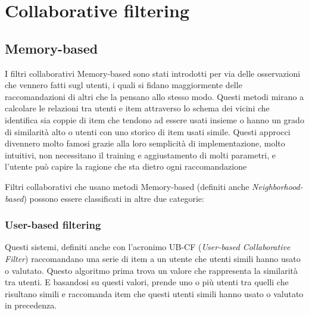 \chapter{Collaborative filtering}









\section{Memory-based} \hfill \break
I filtri collaborativi Memory-based sono stati introdotti per via delle osservazioni che vennero fatti sugl utenti, i quali si fidano
maggiormente delle raccomandazioni di altri che la pensano allo stesso modo. Questi metodi mirano a calcolare le relazioni tra utenti
e item attraverso lo schema dei vicini che identifica sia coppie di item che tendono ad essere usati insieme o hanno un grado di 
similarità alto o utenti con uno storico di item usati simile. \cite{taxonomy-of-recommender-agents-on-the-internet}
Questi approcci divennero molto famosi grazie alla loro semplicità di implementazione, molto intuitivi, non necessitano il training e
aggiustamento di molti parametri, e l'utente può capire la ragione che sta dietro ogni raccomandazione 

Filtri collaborativi che usano metodi Memory-based (definiti anche \textit{Neighborhood-based}) possono essere classificati in altre due
categorie:


\subsection{User-based filtering} \hfill \break
Questi sistemi, definiti anche con l'acronimo UB-CF (\textit{User-based Collaborative Filter}) raccomandano una serie di item a 
un utente che utenti simili hanno usato o valutato. Questo algoritmo prima trova un valore che rappresenta la similarità tra utenti. 
E basandosi su questi valori, prende uno o più utenti tra quelli che risultano simili e raccomanda item che questi utenti simili 
hanno usato o valutato in precedenza.

